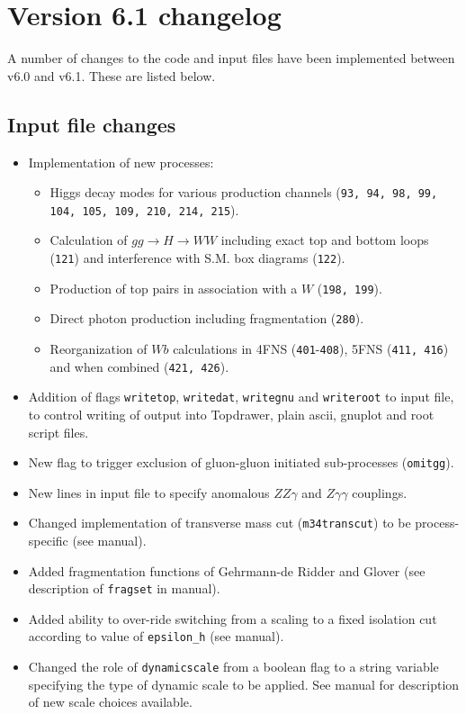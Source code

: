 \documentclass{article}
\begin{document}
{{{{{{\section{Version 6.1 changelog}
\label{changelog}

A number of changes to the code and input files have been implemented
between v6.0 and v6.1. These are listed below.

\subsection{Input file changes}
\begin{itemize}
\item Implementation of new processes:
\begin{itemize}
\item Higgs decay modes for various
production channels ({\tt 93, 94, 98, 99, 104, 105, 109, 210, 214, 215}).
\item Calculation of $gg \to H \to WW$ including exact top and bottom loops ({\tt 121})
and interference with S.M. box diagrams ({\tt 122}).
\item Production of top pairs in association with a $W$ ({\tt 198, 199}).
\item Direct photon production including fragmentation ({\tt 280}).
\item Reorganization of $Wb$ calculations in
4FNS ({\tt 401}-{\tt 408}), 5FNS ({\tt 411, 416}) and when combined
({\tt 421, 426}).
\end{itemize}
\item Addition of flags {\tt writetop}, {\tt writedat}, {\tt writegnu}
and {\tt writeroot} to input file, to control writing of output into Topdrawer,
plain ascii, gnuplot and root script files.
\item New flag to trigger exclusion of gluon-gluon initiated  sub-processes
({\tt omitgg}).
\item New lines in input file to specify anomalous $ZZ\gamma$
and $Z\gamma\gamma$ couplings.
\item Changed implementation of transverse mass cut ({\tt m34transcut})
to be process-specific (see manual).
\item Added fragmentation functions of Gehrmann-de Ridder and Glover
(see description of {\tt fragset} in manual).
\item Added ability to over-ride switching from a scaling to a fixed isolation
cut according to value of {\tt epsilon\_h} (see manual).
\item Changed the role of {\tt dynamicscale} from a boolean flag to a string
variable specifying the type of dynamic scale to be applied. See manual
for description of new scale choices available.
\end{itemize}

}}}}}}
\end{document}
